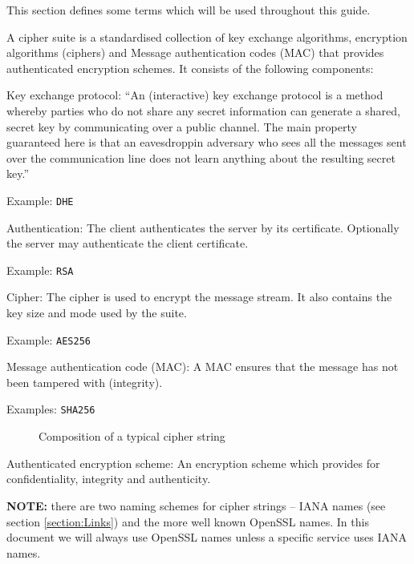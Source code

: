 
This section defines some terms which will be used throughout this guide.


A cipher suite is a standardised collection of key exchange algorithms, encryption 
algorithms (ciphers) and Message authentication codes (MAC) that provides authenticated 
encryption schemes. It consists of the following components:

\begin{description}
\item{Key exchange protocol:}
``An (interactive) key exchange protocol is a method whereby parties who do not 
share any secret information can generate a shared, secret key by communicating 
over a public channel. The main property guaranteed here is that an 
eavesdroppin adversary who sees all the messages sent over the communication 
line does not learn anything about the resulting secret key.'' \cite{katz2008introduction}

Example: \texttt{DHE}

\item{Authentication:}
The client authenticates the server by its certificate. Optionally the server 
may authenticate the client certificate.

Example: \texttt{RSA}

\item{Cipher:}
The cipher is used to encrypt the message stream. It also contains the key size
and mode used by the suite.

Example: \texttt{AES256}

\item{Message authentication code (MAC):}
A MAC ensures that the message has not been tampered with (integrity).

Examples: \texttt{SHA256}


\begin{figure}[h]
\caption{Composition of a typical cipher string}
\end{figure}

\item{Authenticated encryption scheme:}
An encryption scheme which provides for confidentiality, integrity and authenticity.

\item {\textbf{NOTE:}} there are two naming schemes for cipher strings -- IANA names (see section \ref{section:Links}) and the more well known OpenSSL names. In this document we will always use OpenSSL names unless a specific service uses IANA names.

\end{description}

